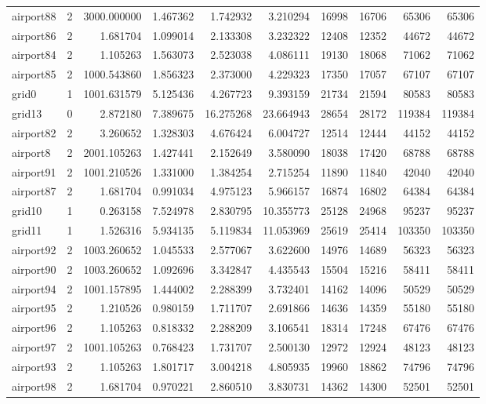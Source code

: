 \begin{longtable}{|l|r|r|r|r|r|r|r|r|r|}
airport88 & 2 & 3000.000000 & 1.467362 & 1.742932 & 3.210294 & 16998 & 16706 & 65306 & 65306 \\
airport86 & 2 & 1.681704 & 1.099014 & 2.133308 & 3.232322 & 12408 & 12352 & 44672 & 44672 \\
airport84 & 2 & 1.105263 & 1.563073 & 2.523038 & 4.086111 & 19130 & 18068 & 71062 & 71062 \\
airport85 & 2 & 1000.543860 & 1.856323 & 2.373000 & 4.229323 & 17350 & 17057 & 67107 & 67107 \\
grid0 & 1 & 1001.631579 & 5.125436 & 4.267723 & 9.393159 & 21734 & 21594 & 80583 & 80583 \\
grid13 & 0 & 2.872180 & 7.389675 & 16.275268 & 23.664943 & 28654 & 28172 & 119384 & 119384 \\
airport82 & 2 & 3.260652 & 1.328303 & 4.676424 & 6.004727 & 12514 & 12444 & 44152 & 44152 \\
airport8 & 2 & 2001.105263 & 1.427441 & 2.152649 & 3.580090 & 18038 & 17420 & 68788 & 68788 \\
airport91 & 2 & 1001.210526 & 1.331000 & 1.384254 & 2.715254 & 11890 & 11840 & 42040 & 42040 \\
airport87 & 2 & 1.681704 & 0.991034 & 4.975123 & 5.966157 & 16874 & 16802 & 64384 & 64384 \\
grid10 & 1 & 0.263158 & 7.524978 & 2.830795 & 10.355773 & 25128 & 24968 & 95237 & 95237 \\
grid11 & 1 & 1.526316 & 5.934135 & 5.119834 & 11.053969 & 25619 & 25414 & 103350 & 103350 \\
airport92 & 2 & 1003.260652 & 1.045533 & 2.577067 & 3.622600 & 14976 & 14689 & 56323 & 56323 \\
airport90 & 2 & 1003.260652 & 1.092696 & 3.342847 & 4.435543 & 15504 & 15216 & 58411 & 58411 \\
airport94 & 2 & 1001.157895 & 1.444002 & 2.288399 & 3.732401 & 14162 & 14096 & 50529 & 50529 \\
airport95 & 2 & 1.210526 & 0.980159 & 1.711707 & 2.691866 & 14636 & 14359 & 55180 & 55180 \\
airport96 & 2 & 1.105263 & 0.818332 & 2.288209 & 3.106541 & 18314 & 17248 & 67476 & 67476 \\
airport97 & 2 & 1001.105263 & 0.768423 & 1.731707 & 2.500130 & 12972 & 12924 & 48123 & 48123 \\
airport93 & 2 & 1.105263 & 1.801717 & 3.004218 & 4.805935 & 19960 & 18862 & 74796 & 74796 \\
airport98 & 2 & 1.681704 & 0.970221 & 2.860510 & 3.830731 & 14362 & 14300 & 52501 & 52501 \\

\end{longtable}
